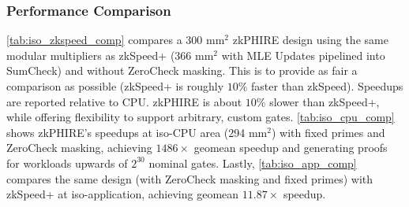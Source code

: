 \begin{table}[]
\caption{Runtime Comparison with zkSpeed+ and CPU for Vanilla gates (speedups are relative to CPU).}
\label{tab:iso_zkspeed_comp}
\end{table}

\subsubsection{Performance Comparison}
\label{sec:perf_comp}
\autoref{tab:iso_zkspeed_comp} compares a 300 mm$^2$ zkPHIRE design using the same modular multipliers as zkSpeed+ (366 mm$^2$ with MLE Updates pipelined into SumCheck) and without ZeroCheck masking. This is to provide as fair a comparison as possible (zkSpeed+ is roughly $10\%$ faster than zkSpeed). Speedups are reported relative to CPU. zkPHIRE is about $10\%$ slower than zkSpeed+, while offering flexibility to support arbitrary, custom gates. \autoref{tab:iso_cpu_comp} shows zkPHIRE's speedups at iso-CPU area (294 mm$^2$) with fixed primes and ZeroCheck masking, achieving $1486\times$ geomean speedup and generating proofs for workloads upwards of $2^{30}$ nominal gates. Lastly,  \autoref{tab:iso_app_comp} compares the same design (with ZeroCheck masking and fixed primes) with zkSpeed+ at iso-application, achieving geomean $11.87\times$ speedup.




